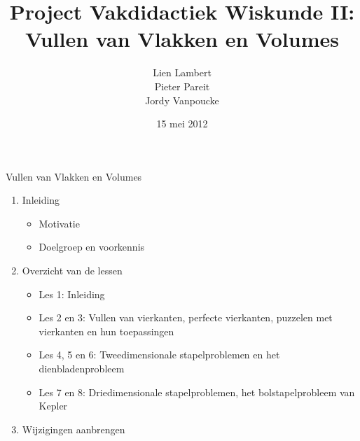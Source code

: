 \documentclass[dutch]{beamer}
\title[Vullen van Vlakken en Volumes]{Project Vakdidactiek Wiskunde II:\\Vullen van Vlakken en Volumes}
\author[Lien Lambert \& Pieter Pareit \& Jordy Vanpoucke ]{Lien Lambert \\Pieter Pareit \\Jordy Vanpoucke}
\date{\tiny 15 mei 2012}
\begin{document}
\frame{
\titlepage}

\begin{frame}{Vullen van Vlakken en Volumes}

\begin{enumerate}
	\item Inleiding
	  \begin{itemize}
	    \item Motivatie
	    \item Doelgroep en voorkennis
    \end{itemize}
  \item Overzicht van de lessen
    \begin{itemize}
	    \item Les 1: Inleiding
	    \item Les 2 en 3: Vullen van vierkanten, perfecte vierkanten, puzzelen met vierkanten en hun toepassingen
	    \item Les 4, 5 en 6: Tweedimensionale stapelproblemen en het dienbladenprobleem
	    \item Les 7 en 8: Driedimensionale stapelproblemen, het bolstapelprobleem van Kepler
    \end{itemize}
  \item Wijzigingen aanbrengen
\end{enumerate}
\end{frame}
\end{document}
